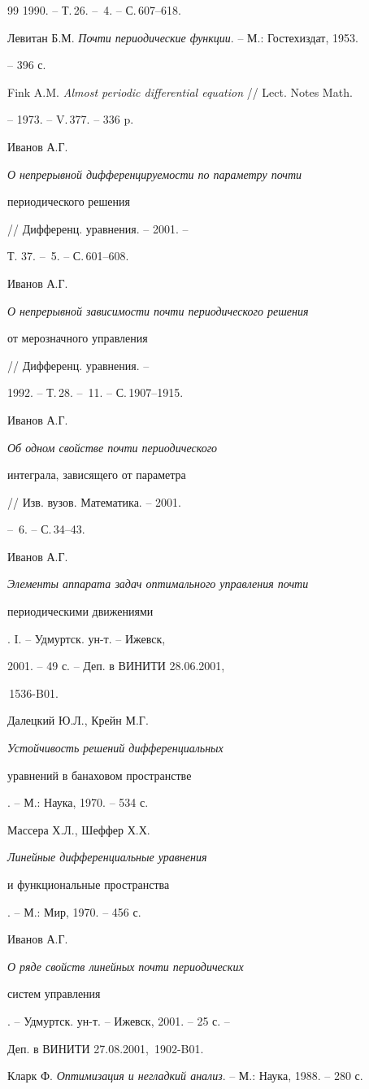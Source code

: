 \begin{thebibliography}{99}
1990. -- Т.\,26. -- \No\,4. -- С.\,607--618.




Левитан Б.М. {\em Почти периодические функции}. -- М.: Гостехиздат, 1953.


-- 396 с.




Fink A.M. {\em Almost periodic differential equation} // Lect. Notes Math.


-- 1973. -- V.\,377. -- 336 p.




Иванов А.Г. {\em О непрерывной дифференцируемости по параметру почти


периодического решения} // Дифференц. уравнения. -- 2001. -- 


Т. 37. -- \No\,5. -- С.\,601--608.




Иванов А.Г. {\em О непрерывной зависимости почти периодического решения


от мерозначного управления} // Дифференц. уравнения. --


1992. -- Т.\,28. -- \No\,11. -- С.\,1907--1915.




Иванов А.Г. {\em Об одном свойстве почти периодического


интеграла, зависящего от параметра} // Изв. вузов. Математика. -- 2001.


-- \No\,6. -- С.\,34--43.




Иванов А.Г. {\em Элементы аппарата задач оптимального управления почти


периодическими движениями}. I. -- Удмуртск. ун-т. -- Ижевск,


2001. -- 49 с. -- Деп. в ВИНИТИ 28.06.2001,


\No\,1536-B01.




Далецкий Ю.Л., Крейн М.Г. {\em Устойчивость решений дифференциальных


уравнений в банаховом пространстве}. -- М.: Наука, 1970. -- 534 с.




Массера Х.Л., Шеффер Х.Х. {\em Линейные дифференциальные уравнения


и функциональные пространства}. -- М.: Мир, 1970. -- 456 с.




Иванов А.Г. {\em О ряде свойств линейных почти периодических


систем управления}. -- Удмуртск. ун-т. -- Ижевск, 2001. -- 25 с. --


Деп. в ВИНИТИ 27.08.2001, \No\,1902-B01.




Кларк Ф. {\em Оптимизация и негладкий анализ}. -- М.: Наука, 1988. -- 280 с.





\end{thebibliography}





